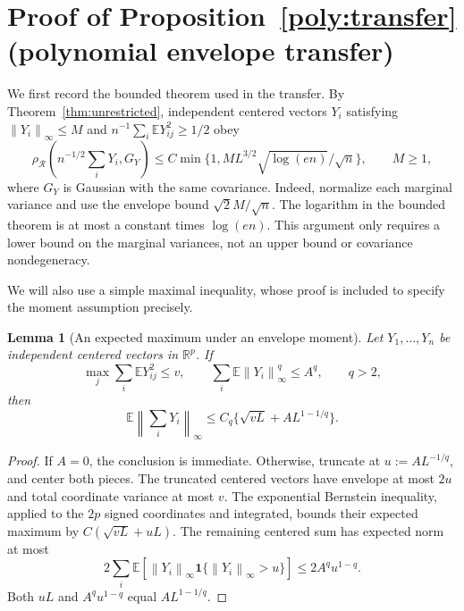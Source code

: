 \documentclass[11pt,letterpaper]{article}
\newtheorem{lemma}{Lemma}
\theoremstyle{remark}
\newcommand{\E}{\mathbb E}
\newcommand{\R}{\mathbb R}
\newcommand{\norm}[1]{\left\lVert#1\right\rVert}
\newcommand{\rh}{\rho_{\mathcal R}}
\newcommand{\ind}{\mathbf 1}
\begin{document}
\section{Proof of Proposition~\ref*{poly:transfer} (polynomial envelope transfer)}\label{app:conditional}

We first record the bounded theorem used in the transfer. By Theorem~\ref{thm:unrestricted}, independent
centered vectors \(Y_i\) satisfying \(\norm{Y_i}_\infty\le M\)
and \(n^{-1}\sum_i\E Y_{ij}^2\ge1/2\) obey
\begin{equation}
 \rh\left(n^{-1/2}\sum_iY_i,G_Y\right)
 \le C\min\{1,ML^{3/2}\sqrt{\log(en)}/\sqrt n\},\qquad M\ge1,
 \label{app:bounded-input}
\end{equation}
where \(G_Y\) is Gaussian with the same covariance. Indeed, normalize
each marginal variance and use the envelope bound \(\sqrt2 M/\sqrt n\).
The logarithm in the bounded theorem is at most a constant times
\(\log(en)\). This argument only requires a lower bound on the marginal
variances, not an upper bound or covariance nondegeneracy.

We will also use a simple maximal inequality, whose proof is included
to specify the moment assumption precisely.

\begin{lemma}[An expected maximum under an envelope moment]\label{lem:maximum}
Let \(Y_1,\ldots,Y_n\) be independent centered vectors in \(\R^p\).
If
\[
 \max_j\sum_i\E Y_{ij}^2\le v,\qquad
 \sum_i\E\norm{Y_i}_\infty^q\le A^q,\qquad q>2,
\]
then
\begin{equation}
 \E\norm{\sum_iY_i}_\infty
 \le C_q\{\sqrt{vL}+AL^{1-1/q}\}.
 \label{app:maximal}
\end{equation}
\end{lemma}
\begin{proof}
If \(A=0\), the conclusion is immediate. Otherwise, truncate at
\(u:=AL^{-1/q}\), and center both pieces. The truncated centered
vectors have envelope at most \(2u\) and total coordinate variance at
most \(v\). The exponential Bernstein inequality, applied to the
\(2p\) signed coordinates and integrated, bounds their expected maximum
by \(C(\sqrt{vL}+uL)\). The remaining centered sum has expected norm
at most
\[
 2\sum_i\E[\norm{Y_i}_\infty\ind\{\norm{Y_i}_\infty>u\}]
 \le2A^qu^{1-q}.
\]
Both \(uL\) and \(A^qu^{1-q}\) equal \(AL^{1-1/q}\).
\end{proof}
\end{document}
